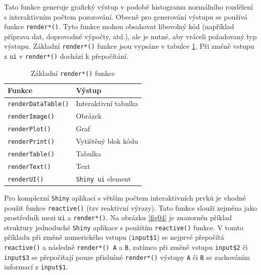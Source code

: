 \documentclass[12pt,]{article}
\begin{document}
Tato funkce generuje grafický výstup v podobě histogramu normálního
rozdělení s interaktivním počtem pozorování. Obecně pro generování
výstupu se používá funkce \texttt{render*()}. Tyto funkce mohou
obsahovat libovolný kód (například příprava dat, doprovodné výpočty,
atd.), ale je nutné, aby vráceli požadovaný typ výstupu. Základní
\texttt{render*()} funkce jsou vypsáne v tabulce \ref{tab3}. Při změně
vstupu z \texttt{ui} v \texttt{render*()} dochází k přepočítání.

\begin{table}[H]
\centering
\begin{tabular}{@{}ll@{}}
\toprule
\multicolumn{1}{l}{Funkce}  & \multicolumn{1}{l}{Výstup}  \\ \midrule
\texttt{renderDataTable()}  & Interaktivní tabulka  \\
\texttt{renderImage()}  & Obrázek \\
\texttt{renderPlot()} & Graf  \\
\texttt{renderPrint()}  & Vytištěný blok kódu \\
\texttt{renderTable()}  & Tabulka  \\
\texttt{renderText()} & Text \\
\texttt{renderUI()} & \texttt{Shiny ui} element \\ \bottomrule
\end{tabular}
\caption{Základní \texttt{render*()} funkce}
\label{tab3}
\end{table}

\newpage

\qquad Pro komplexní \texttt{Shiny} aplikaci s větším počtem
interaktivních prvků je vhodné použit funkce \texttt{reactive()} (tzv
reaktivní výrazy). Tato funkce slouží zejména jako prostředník mezi
\texttt{ui} a \texttt{render*()}. Na obrázku \ref{fig04} je znazorněn
příklad struktury jednoduché \texttt{Shiny} aplikace s použítím
\texttt{reactive()} funkce. V tomto příkladu při změně numerického
vstupu (\texttt{input\$1}) se nejprvé přepočítá \texttt{reactive()} a
následně \texttt{render*()\ A} a \texttt{B}, zatímco při změně vstupu
\texttt{input\$2} či \texttt{input\$3} se přepočítají pouze přislušné
\texttt{render*()} výstupy \texttt{A} či \texttt{B} se zachováním
informací z \texttt{input\$1}.
\end{document}
